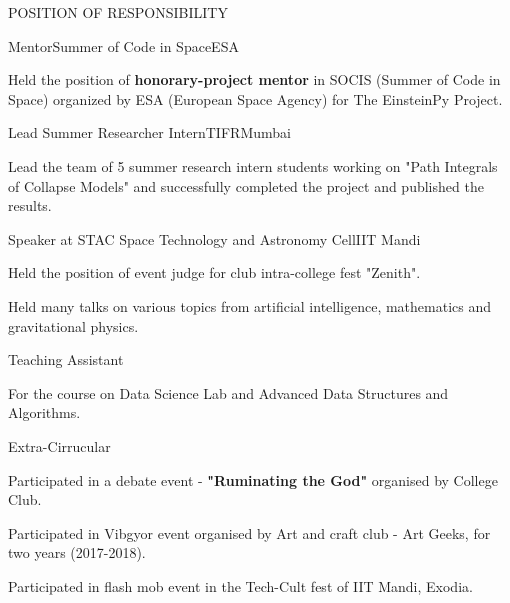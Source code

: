 \documentclass{resume} %
\begin{document}

\begin{rSection}{POSITION OF RESPONSIBILITY}
\begin{rSubsection}{Mentor}{}{Summer of Code in Space}{ESA}
\item  Held the position of \textbf{honorary-project mentor} in SOCIS (Summer of
Code in Space) organized by ESA (European Space Agency) for
The EinsteinPy Project.
\end{rSubsection}

\begin{rSubsection}{Lead Summer Researcher Intern}{}{TIFR}{Mumbai}
\item  Lead the team of 5 summer research intern students working on "Path Integrals of Collapse Models" and successfully completed the project and published the results.
\end{rSubsection}

\begin{rSubsection}{Speaker at STAC }{}{Space Technology and Astronomy Cell}{IIT Mandi}
\item Held the position of event judge for club intra-college fest "Zenith".
\item Held many talks on various topics from artificial intelligence, mathematics and gravitational physics.
\end{rSubsection}

\begin{rSubsection}{Teaching Assistant}{}{}{}
\item For the course on Data Science Lab and Advanced Data Structures and Algorithms.
\end{rSubsection}

\end{rSection}

\begin{rSection}{Extra-Cirrucular} \itemsep -3pt
\item Participated in a debate event - \textbf{"Ruminating the God"} organised by College Club.
\item Participated in Vibgyor event organised by Art and craft club - Art Geeks, for two years (2017-2018).
\item Participated in flash mob event in the Tech-Cult fest of IIT Mandi, Exodia.

\end{rSection}
\end{document}
